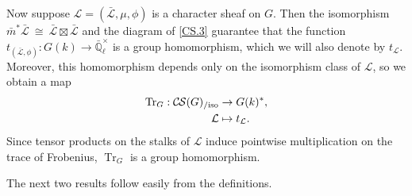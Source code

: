 \documentclass[10pt]{amsart}
\theoremstyle{plain}
\theoremstyle{definition}
\newcommand{\EE}{\mathbb{\bar Q}_\ell}
\newcommand{\Fq}{k}
\newcommand{\EEx}{\EE^\times}
\newcommand{\iso}{{\ \cong\ }}
\newcommand{\trFrob}[1]{t_{#1}}
\newcommand{\TrFrob}[1]{\operatorname{Tr}_{#1}}
\newcommand{\cs}[1]{{\mathcal{#1}}}
\newcommand{\gcs}[1]{{\mathcal{\bar #1}}}
\newcommand{\CS}{{\mathcal{C\hskip-0.8pt S}}}
\newcommand{\CSiso}[1]{\CS(#1)_{/\text{iso}}}
\newcommand{\bm}{\bar{m}}
\begin{document}
Now suppose $\cs{L} = (\gcs{L},\mu,\phi)$ is a character sheaf on $G$.
Then the isomorphism $\bm^* \gcs{L} \iso \gcs{L} \boxtimes\gcs{L}$ and the diagram of
\ref{CS.3} guarantee
that the function $\trFrob{(\gcs{L},\phi)} : G(\Fq)\to \EEx$ is a group homomorphism, which we will also denote by $\trFrob{\cs{L}}$.
Moreover, this homomorphism depends only on the isomorphism class of $\cs{L}$, so we obtain a map
\begin{align*}
\TrFrob{G} : \CSiso{G} &\to G(\Fq)^*, \\
\cs{L} &\mapsto \trFrob{\cs{L}}.
\end{align*}
Since tensor products on the stalks of $\cs{L}$ induce pointwise multiplication on the trace of Frobenius, $\TrFrob{G}$ is a group homomorphism.  

The next two results follow easily from the definitions.
\end{document}
